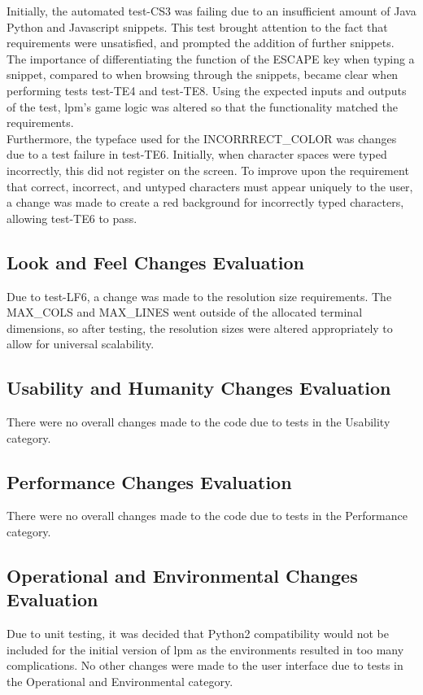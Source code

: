 \documentclass[12pt, titlepage]{article}
\begin{document}
Initially, the automated test-CS3 was failing due to an insufficient amount of Java Python and Javascript snippets. This test brought attention to the fact that requirements were unsatisfied, and prompted the addition of further snippets. \\

The importance of differentiating the function of the ESCAPE key when typing a snippet, compared to when browsing through the snippets, became clear when performing tests test-TE4 and test-TE8. Using the expected inputs and outputs of the test, lpm's game logic was altered so that the functionality matched the requirements. \\

Furthermore, the typeface used for the INCORRRECT\_COLOR was changes due to a test failure in test-TE6. Initially, when character spaces were typed incorrectly, this did not register on the screen. To improve upon the requirement that correct, incorrect, and untyped characters must appear uniquely to the user, a change was made to create a red background for incorrectly typed characters, allowing test-TE6 to pass. \\

\subsection{Look and Feel Changes Evaluation}
Due to test-LF6, a change was made to the resolution size requirements. The MAX\_COLS and MAX\_LINES went outside of the allocated terminal dimensions, so after testing, the resolution sizes were altered appropriately to allow for universal scalability.

\subsection{Usability and Humanity Changes Evaluation}
There were no overall changes made to the code due to tests in the Usability category.

\subsection{Performance Changes Evaluation}
There were no overall changes made to the code due to tests in the Performance category.

\subsection{Operational and Environmental Changes Evaluation}
Due to unit testing, it was decided that Python2 compatibility would not be included for the initial version of lpm as the environments resulted in too many complications. No other changes were made to the user interface due to tests in the Operational and Environmental category.
\end{document}
